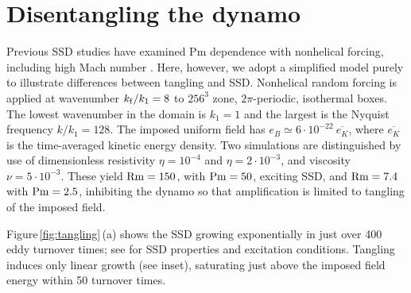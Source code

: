 \documentclass[preprint2]{aastex63}
\newcommand\Rm{{\rm Rm} }
\newcommand\Pm{{\rm Pm} }
\newcommand\kf{k_{\rm f} }
\newcommand{\fg}[1]{\textcolor{midgreen}{#1}}
\begin{document}
\section{Disentangling the dynamo} \label{sec:ssd-tang}

 \fg{Previous SSD studies have examined Pm dependence with
 nonhelical forcing, including high Mach number \citep[e.g.,][]{ 
 HBD03,HBD04,Haugen:2004M,FCSBKS11,FSBS14}.}
 \fg{Here, however, we adopt a simplified model purely t}o illustrate
 differences between tangling and SSD.
 Nonhelical random forcing is applied at wavenumber $\kf/k_1=8$ to
 $256^3$ zone, $2\pi$-periodic, isothermal boxes.
 The lowest wavenumber in the domain is $k_1=1$ and the largest is the Nyquist
 frequency $k/k_1 = 128$.
 The imposed uniform field has $e_B\simeq6\cdot10^{-22}~\overline{e_K}$, where
 $\overline{e_K}$ is the time-averaged kinetic energy density.
 Two simulations are distinguished by use of dimensionless
 resistivity $\eta=10^{-4}$
 and $\eta=2\cdot10^{-3}$, and viscosity $\nu=5\cdot10^{-3}$.
 These yield $\Rm=150$, with $\Pm = 50$, exciting SSD, and $\Rm=7.4$ with
 $\Pm=2.5$, inhibiting the dynamo so that amplification is limited to tangling
 of the imposed field.

 Figure\,\ref{fig:tangling}\,(a) shows the SSD growing exponentially in just over
 400 eddy turnover times; see \cite{ZRS83} for SSD properties and excitation
 conditions.
 Tangling induces only linear growth (see inset), saturating just above
 the imposed field energy within 50 turnover times.
\end{document}

